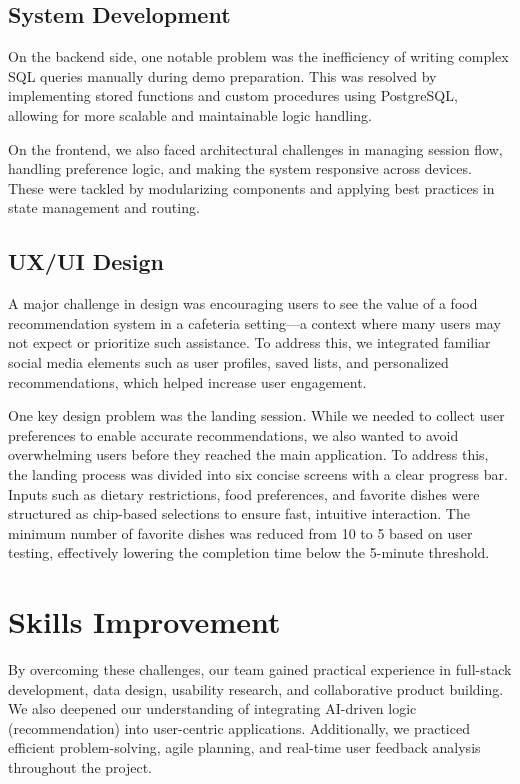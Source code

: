 \subsection{System Development}
\label{subsection:system-develop-challenge}
On the backend side, one notable problem was the inefficiency of writing complex SQL queries manually during demo preparation. This was resolved by implementing stored functions and custom procedures using PostgreSQL, allowing for more scalable and maintainable logic handling.

On the frontend, we also faced architectural challenges in managing session flow, handling preference logic, and making the system responsive across devices. These were tackled by modularizing components and applying best practices in state management and routing.

\subsection{UX/UI Design}
\label{subsection:ux-ui-design-challenge}
A major challenge in design was encouraging users to see the value of a food recommendation system in a cafeteria setting—a context where many users may not expect or prioritize such assistance. To address this, we integrated familiar social media elements such as user profiles, saved lists, and personalized recommendations, which helped increase user engagement.

One key design problem was the landing session. While we needed to collect user preferences to enable accurate recommendations, we also wanted to avoid overwhelming users before they reached the main application. To address this, the landing process was divided into six concise screens with a clear progress bar. Inputs such as dietary restrictions, food preferences, and favorite dishes were structured as chip-based selections to ensure fast, intuitive interaction. The minimum number of favorite dishes was reduced from 10 to 5 based on user testing, effectively lowering the completion time below the 5-minute threshold.

\section{Skills Improvement}
\label{section:skill-improvement}
By overcoming these challenges, our team gained practical experience in full-stack development, data design, usability research, and collaborative product building. We also deepened our understanding of integrating AI-driven logic (recommendation) into user-centric applications. Additionally, we practiced efficient problem-solving, agile planning, and real-time user feedback analysis throughout the project.

